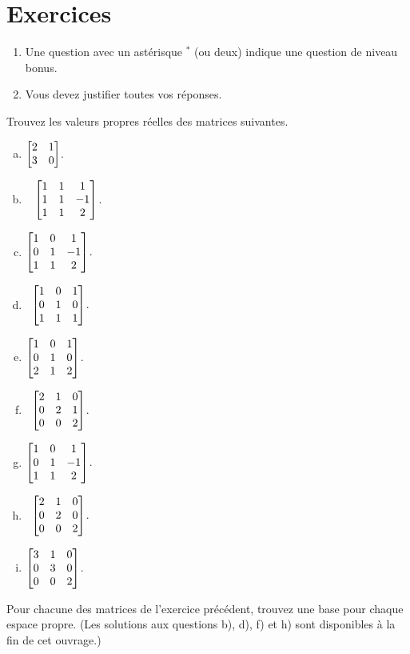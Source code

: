 \section*{Exercices}


\begin{enumerate}
\item Une question avec un astérisque $ ^\ast$ (ou deux) indique une question de niveau bonus.
 \item Vous devez justifier toutes vos réponses.
\end{enumerate}
\bigskip



\begin{prob} \label{prob22.1} Trouvez les valeurs propres réelles des matrices suivantes. 
\medskip
\begin{enumerate}[a)]
 
\item $\bmatrix
2&1\\3&0 \endbmatrix $.
\medskip
\item\sov~ $\bmatrix 
1&1&1\\1&1&-1\\1&1&2 \endbmatrix $.
\medskip
\item $\bmatrix 
1&0&1\\0&1&-1\\1&1&2 \endbmatrix $.
\medskip

\item\sov~$\bmatrix 
1&0&1\\0&1&0\\1&1&1 \endbmatrix $.
\medskip
\item $\bmatrix 
1&0&1\\0&1&0\\2&1&2 \endbmatrix $.
\medskip
\item\sov~$\bmatrix 
2&1&0\\0&2&1\\0&0&2 \endbmatrix $.
\medskip
\item $\bmatrix 
1&0&1\\0&1&-1\\1&1&2 \endbmatrix $.\medskip
\item\sov~$\bmatrix 
2&1&0\\0&2&0\\0&0&2 \endbmatrix $.
\medskip
\item $\bmatrix 
3&1&0\\0&3&0\\0&0&2 \endbmatrix $.
\medskip
 
\end{enumerate}

\end{prob} \begin{prob} \label{prob22.2} Pour chacune des matrices de l'exercice précédent, trouvez une base pour chaque espace propre. (Les solutions aux questions b), d), f) et h) sont disponibles à la fin de cet ouvrage.)\medskip


\end{prob}
